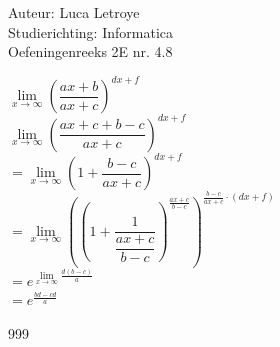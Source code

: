 \documentclass[a4paper]{article}
\begin{document}
  
\noindent \large Auteur: Luca Letroye        \\
\noindent \large Studierichting: Informatica \\
\noindent \large Oefeningenreeks 2E nr. 4.8 \\

\medskip

\normalsize


$\lim\limits_{x \to \infty} \left( \dfrac{ax + b}{ax + c} \right)^{dx+f} $\\

$\lim\limits_{x \to \infty} \left( \dfrac{ax + c + b - c}{ax + c} \right)^{dx+f} $\\

$= \lim\limits_{x \to \infty} \left(1 + \dfrac{b-c}{ax + c} \right)^{dx+f} $\\

$= \lim\limits_{x \to \infty} \left( \left(1 + \dfrac{1}{\dfrac{ax+c}{b-c}} \right)^{\tfrac{ax+c}{b-c}}\right)^{\tfrac{b-c}{ax+c}\cdot (dx+f)} $\\

$= e^{\lim\limits_{x \to \infty} \tfrac{d(b-c)}{a}} $\\

$= e^{\tfrac{bd-cd}{a}} $\\




\begin{thebibliography}{999}
\end{thebibliography}
\end{document}

